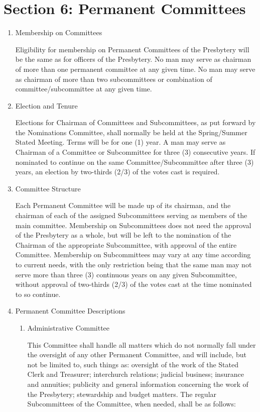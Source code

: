 \documentclass[
]{book}
\begin{document}
\hypertarget{section-6-permanent-committees}{%
\section*{Section 6: Permanent Committees}\label{section-6-permanent-committees}}

\begin{enumerate}
\def\labelenumi{\Alph{enumi}.}
\item
  Membership on Committees

  Eligibility for membership on Permanent Committees of the Presbytery will be the same as for officers of the Presbytery. No man may serve as chairman of more than one permanent committee at any given time. No man may serve as chairman of more than two subcommittees or combination of committee/subcommittee at any given time.
\item
  Election and Tenure

  Elections for Chairman of Committees and Subcommittees, as put forward by the Nominations Committee, shall normally be held at the Spring/Summer Stated Meeting. Terms will be for one (1) year. A man may serve as Chairman of a Committee or Subcommittee for three (3) consecutive years. If nominated to continue on the same Committee/Subcommittee after three (3) years, an election by two-thirds (2/3) of the votes cast is required.
\item
  Committee Structure

  Each Permanent Committee will be made up of its chairman, and the chairman of each of the assigned Subcommittees serving as members of the main committee. Membership on Subcommittees does not need the approval of the Presbytery as a whole, but will be left to the nomination of the Chairman of the appropriate Subcommittee, with approval of the entire Committee. Membership on Subcommittees may vary at any time according to current needs, with the only restriction being that the same man may not serve more than three (3) continuous years on any given Subcommittee, without approval of two-thirds (2/3) of the votes cast at the time nominated to so continue.
\item
  Permanent Committee Descriptions

  \begin{enumerate}
  \def\labelenumii{\arabic{enumii}.}
  \item
    Administrative Committee

    This Committee shall handle all matters which do not normally fall under the oversight of any other Permanent Committee, and will include, but not be limited to, such things as: oversight of the work of the Stated Clerk and Treasurer; interchurch relations; judicial business; insurance and annuities; publicity and general information concerning the work of the Presbytery; stewardship and budget matters. The regular Subcommittees of the Committee, when needed, shall be as follows:


\end{enumerate}
\end{enumerate}
\end{document}
